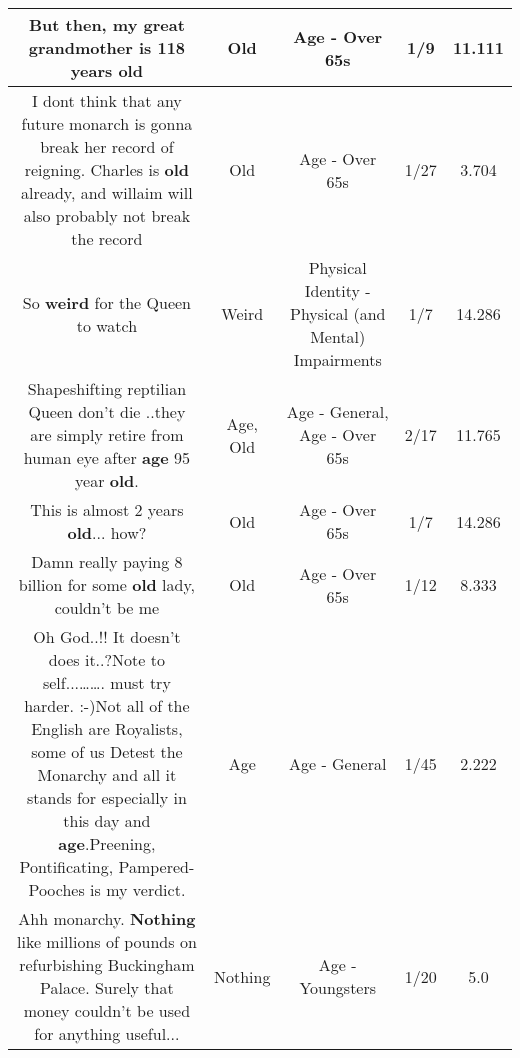 \documentclass[11pt]{article}
\newlength\mylength
\begin{document}
\begin{center}
\begin{longtable}{|C{.65\mylength}|C{.30\mylength}|C{.12\mylength}|C{.12\mylength}|C{.12\mylength}|}
  \small But then, my great grandmother is 118 years old\normalsize   & Old & Age - Over 65s & 1/9 & 11.111 \\  \hline
  \small I dont think that any future monarch is gonna break her record of reigning. Charles is \textbf{old} already, and willaim will also probably not break the record\normalsize   & Old & Age - Over 65s & 1/27 & 3.704 \\  \hline
  \small So \textbf{weird} for the Queen to watch\normalsize   & Weird & Physical Identity - Physical (and Mental) Impairments & 1/7 & 14.286 \\  \hline
  \small Shapeshifting reptilian Queen don't die ..they are simply retire from human eye after \textbf{age} 95 year \textbf{old}.\normalsize   & Age, Old & Age - General, Age - Over 65s & 2/17 & 11.765 \\  \hline
  \small This is almost 2 years \textbf{old}... how?\normalsize   & Old & Age - Over 65s & 1/7 & 14.286 \\  \hline
  \small Damn really paying 8 billion for some \textbf{old} lady, couldn't be me\normalsize   & Old & Age - Over 65s & 1/12 & 8.333 \\  \hline
  \small {}  Oh God..!!  It doesn't does it..?Note to self...……. must try harder.  :-)Not all of the English are Royalists, some of us Detest the Monarchy and all it stands for especially in this day and \textbf{age}.Preening, Pontificating, Pampered-Pooches is my verdict.\normalsize   & Age & Age - General & 1/45 & 2.222 \\  \hline
  \small Ahh monarchy. \textbf{Nothing} like millions of pounds on refurbishing Buckingham Palace. Surely that money couldn't be used for anything useful...\normalsize   & Nothing & Age - Youngsters & 1/20 & 5.0 \\  \hline

\end{longtable}
\end{center}
\end{document}
